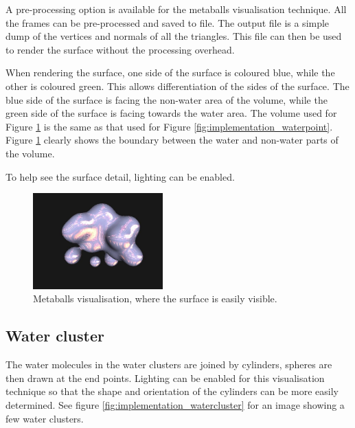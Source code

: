 A pre-processing option is available for the metaballs visualisation technique.
All the frames can be pre-processed and saved to file. The output file is a
simple dump of the vertices and normals of all the triangles. This file can
then be used to render the surface without the processing overhead.

When rendering the surface, one side of the surface is coloured blue, while the
other is coloured green. This allows differentiation of the sides of the
surface. The blue side of the surface is facing the non-water area of the
volume, while the green side of the surface is facing towards the water area.
The volume used for Figure \ref{fig:implementation_metaballs} is the same as
that used for Figure \ref{fig:implementation_waterpoint}. Figure
\ref{fig:implementation_metaballs} clearly shows the boundary between the water
and non-water parts of the volume.

To help see the surface detail, lighting can be enabled.

\begin{figure}[h!]
  \begin{center}
    \includegraphics[width=50mm]{metaballs}
  \end{center}
  \caption{Metaballs visualisation, where the surface is easily visible.}
  \label{fig:implementation_metaballs}
\end{figure}


\subsection{Water cluster}
\label{sub:implementation_cluster}

The water molecules in the water clusters are joined by cylinders, spheres are
then drawn at the end points. Lighting can be enabled for this visualisation
technique so that the shape and orientation of the cylinders can be more easily
determined. See figure \ref{fig:implementation_watercluster} for an image
showing a few water clusters.

